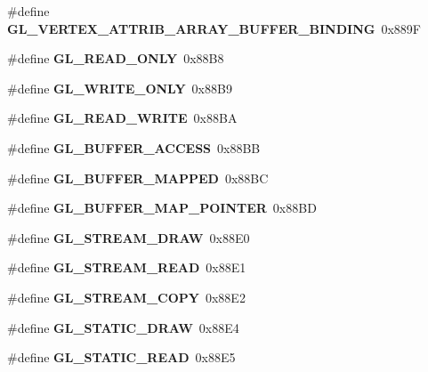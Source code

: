 \begin{DoxyCompactItemize}
\item 
\#define {\bfseries G\+L\+\_\+\+V\+E\+R\+T\+E\+X\+\_\+\+A\+T\+T\+R\+I\+B\+\_\+\+A\+R\+R\+A\+Y\+\_\+\+B\+U\+F\+F\+E\+R\+\_\+\+B\+I\+N\+D\+I\+N\+G}~0x889\+F\label{_s_d_l__opengl_8h_a65e409180ae116e584f27b88d3429e2b}

\item 
\#define {\bfseries G\+L\+\_\+\+R\+E\+A\+D\+\_\+\+O\+N\+L\+Y}~0x88\+B8\label{_s_d_l__opengl_8h_afe26dad29b9cb2620e815e5fecea71f9}

\item 
\#define {\bfseries G\+L\+\_\+\+W\+R\+I\+T\+E\+\_\+\+O\+N\+L\+Y}~0x88\+B9\label{_s_d_l__opengl_8h_ab43997c5949dffce6674a7bb8a3059da}

\item 
\#define {\bfseries G\+L\+\_\+\+R\+E\+A\+D\+\_\+\+W\+R\+I\+T\+E}~0x88\+B\+A\label{_s_d_l__opengl_8h_aa5fd429fd2b79f5936c1421afb205dcd}

\item 
\#define {\bfseries G\+L\+\_\+\+B\+U\+F\+F\+E\+R\+\_\+\+A\+C\+C\+E\+S\+S}~0x88\+B\+B\label{_s_d_l__opengl_8h_a2f96540081e62b2137b049d19dffe23e}

\item 
\#define {\bfseries G\+L\+\_\+\+B\+U\+F\+F\+E\+R\+\_\+\+M\+A\+P\+P\+E\+D}~0x88\+B\+C\label{_s_d_l__opengl_8h_af551f91736f672b4da7cb21790040656}

\item 
\#define {\bfseries G\+L\+\_\+\+B\+U\+F\+F\+E\+R\+\_\+\+M\+A\+P\+\_\+\+P\+O\+I\+N\+T\+E\+R}~0x88\+B\+D\label{_s_d_l__opengl_8h_a627d65edccdcab9bae34bbec24d20f90}

\item 
\#define {\bfseries G\+L\+\_\+\+S\+T\+R\+E\+A\+M\+\_\+\+D\+R\+A\+W}~0x88\+E0\label{_s_d_l__opengl_8h_aaab0960233739efbd5d1ae2b2fb919cd}

\item 
\#define {\bfseries G\+L\+\_\+\+S\+T\+R\+E\+A\+M\+\_\+\+R\+E\+A\+D}~0x88\+E1\label{_s_d_l__opengl_8h_abd37e222235517858eb4fe1d8c09de40}

\item 
\#define {\bfseries G\+L\+\_\+\+S\+T\+R\+E\+A\+M\+\_\+\+C\+O\+P\+Y}~0x88\+E2\label{_s_d_l__opengl_8h_a6321e334ff05c0a003c26d5f953989e8}

\item 
\#define {\bfseries G\+L\+\_\+\+S\+T\+A\+T\+I\+C\+\_\+\+D\+R\+A\+W}~0x88\+E4\label{_s_d_l__opengl_8h_ab7dffdc215fbbe75b6ccacfecfc14648}

\item 
\#define {\bfseries G\+L\+\_\+\+S\+T\+A\+T\+I\+C\+\_\+\+R\+E\+A\+D}~0x88\+E5\label{_s_d_l__opengl_8h_a2cf81671d9eb48057082ae18523d5a4a}


\end{DoxyCompactItemize}
